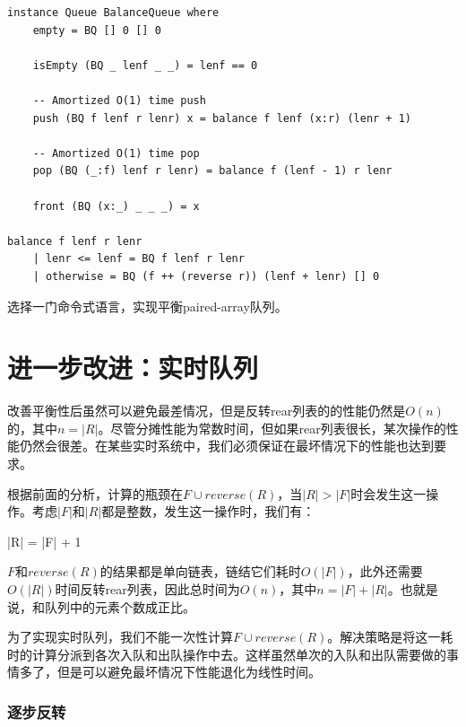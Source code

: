 \documentclass[UTF8]{article}
\begin{document}
\lstset{language=Haskell}
\begin{lstlisting}
instance Queue BalanceQueue where
    empty = BQ [] 0 [] 0

    isEmpty (BQ _ lenf _ _) = lenf == 0

    -- Amortized O(1) time push
    push (BQ f lenf r lenr) x = balance f lenf (x:r) (lenr + 1)

    -- Amortized O(1) time pop
    pop (BQ (_:f) lenf r lenr) = balance f (lenf - 1) r lenr

    front (BQ (x:_) _ _ _) = x

balance f lenf r lenr
    | lenr <= lenf = BQ f lenf r lenr
    | otherwise = BQ (f ++ (reverse r)) (lenf + lenr) [] 0
\end{lstlisting}

\begin{Exercise}
选择一门命令式语言，实现平衡paired-array队列。
\end{Exercise}

\section{进一步改进：实时队列}

改善平衡性后虽然可以避免最差情况，但是反转rear列表的的性能仍然是$O(n)$的，其中$n = |R|$。尽管分摊性能为常数时间，但如果rear列表很长，某次操作的性能仍然会很差。在某些实时系统中，我们必须保证在最坏情况下的性能也达到要求。

根据前面的分析，计算的瓶颈在$ F \cup reverse(R)$，当$|R| > |F|$时会发生这一操作。考虑$|F|$和$|R|$都是整数，发生这一操作时，我们有：

\be
  |R| = |F| + 1
\ee

$F$和$reverse(R)$的结果都是单向链表，链结它们耗时$O(|F|)$，此外还需要$O(|R|)$时间反转rear列表，因此总时间为$O(n)$，其中$n = |F| + |R|$。也就是说，和队列中的元素个数成正比。

为了实现实时队列，我们不能一次性计算$ F \cup reverse(R)$。解决策略是将这一耗时的计算分派到各次入队和出队操作中去。这样虽然单次的入队和出队需要做的事情多了，但是可以避免最坏情况下性能退化为线性时间。

\subsubsection{逐步反转}
\end{document}
